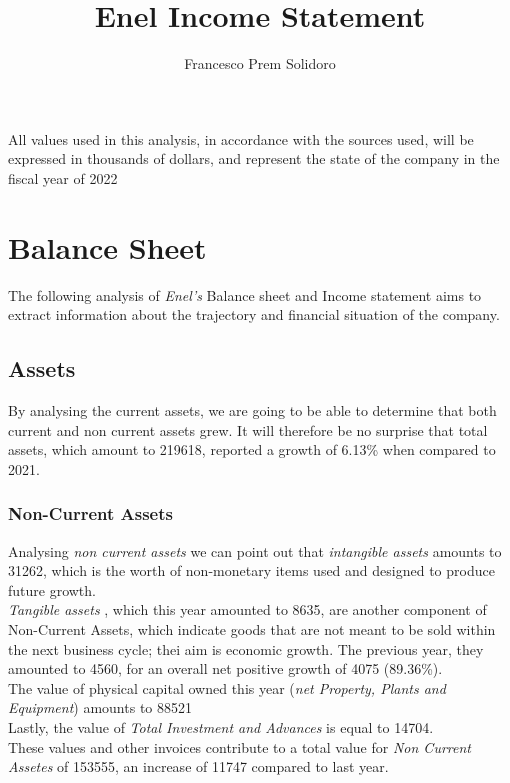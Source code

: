 \documentclass{article}
\title{Enel Income Statement}
\author{Francesco Prem Solidoro}
\begin{document}
\maketitle
\tableofcontents
All values used in this analysis, in accordance with the sources used, will be expressed in thousands of dollars, and represent the state of the company in the fiscal year of 2022
\section{Balance Sheet}
The following analysis of \textit{Enel's} Balance sheet and Income statement aims to extract information about the trajectory and financial situation of the company.
\subsection{Assets}
By analysing the current assets, we are going to be able to determine that both current and non current assets grew. It will therefore be no surprise that total assets, which amount to 219618, reported a growth of 6.13\% when compared to 2021.
\subsubsection{Non-Current Assets}
Analysing \textit{ non current assets } we can point out that \textit{ intangible assets } amounts to 31262, which is the worth of non-monetary items used and designed to produce future growth.\\
\textit{ Tangible assets }, which this year amounted to 8635, are another component of Non-Current Assets, which indicate goods that are not meant to be sold within the next business cycle; thei aim is economic growth. The previous year, they amounted to 4560, for an overall net positive growth of 4075 (89.36\%).\\
The value of physical capital owned this year (\textit{net Property, Plants and Equipment}) amounts to 88521\\
Lastly, the value of \textit{Total Investment and Advances} is equal to 14704. \\
These values and other invoices contribute to a total value for \textit{Non Current Assetes} of 153555, an increase of 11747 compared to last year.
\end{document}
